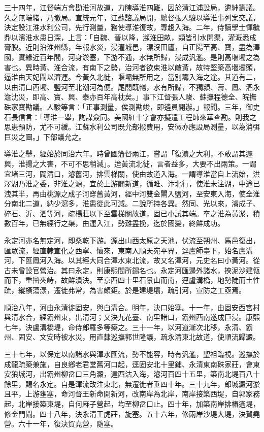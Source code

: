 \begin{pinyinscope}
三十四年，江督端方會勘淮河故道，力陳導淮四難，因於清江浦設局，遴紳籌議。久之無端緒，乃撤局。宣統元年，江蘇諮議局開，總督張人駿以導淮事列案交議，決定設江淮水利公司，先行測量，務使導淮復故，專趨入海。二年，侍讀學士惲毓鼎以濱淮水患日深，上言：「自魏、晉以降，瀕淮田畝，類皆引水開渠，灌溉悉成膏腴。近則沿淮州縣，年報水災，浸灌城邑，漂沒田廬，自正陽至高、寶，盡為澤國，實緣近百年間，河身淤塞，下游不通，水無所歸，浸成汎濫。是則高堰壩之為害也。異時黃、淮合流，有南下之勢，治河者欲束淮以敵黃，故特堅築高堰壩頭，逼淮由天妃閘以濟運。今黃久北徙，堰壩無所用之，當別籌入海之途。其道有二，以由清口西壩、鹽河至北潮河為便。尾閭既暢，水有所歸，不獨潁、壽、鳳、泗永澹沈災，即高、寶、興、泰亦百年高枕矣。」事下江督張人駿、蘇撫程德全、皖撫硃家寶勘議。人駿等言：「正事測量，俟測勘竣，即遴員開辦。」報聞。三年，御史石長信言：「導淮一舉，詢謀僉同。美國紅十字會亦擬遣工程師來華查勘。則我之思患預防，尤不可緩。江蘇水利公司既允部撥費用，安徽亦應設局測量，以為消弭巨災之圖。」下部議允之。

導淮之舉，經始於同治六年。時曾國籓督兩江，嘗謂「復瀆之大利，不敢謂其遽興，淮揚之大害，不可不思稍減」。迨黃流北徙，言者益多，大要不出兩策。一謂宜堵三河，闢清口，濬舊河，排雲梯關，使由故道入海。一謂導淮當自上流始，洪澤湖乃淮之委，非淮之源，宜於上游闢新道，循睢、汴北行，使淮未注湖，中途已洩其半，再由桃源之成子河穿舊黃河，經中河雙金閘入鹽河，至安東入海，使全淮分南北二道，納少瀉多，淮患從此可減。二說所持各異。然同、光以來，濬成子、碎石、沂、泗等河，疏楊莊以下至雲梯關故道，固已小試其端。卒之淮為黃淤，積數百年，已無經行之渠，由運入江，勢難盡挽，迄於國變，終鮮成功。

永定河亦名無定河，即桑乾下游。源出山西太原之天池，伏流至朔州、馬邑復出，匯眾流，經直隸宣化之西寧、懷來，東南入順天宛平界，逕盧師臺下，始名盧溝河，下匯鳳河入海。以其經大同合渾水東北流，故又名渾河，元史名曰小黃河。從古未曾設官營治。其曰永定，則康熙間所錫名也。永定河匯邊外諸水，挾泥沙建瓴而下，重巒夾峙，故鮮潰決。至京西四十里石景山而南，逕盧溝橋，地勢陡而土性疏，縱橫蕩漾，遷徙弗常，為害頗鉅。於是建堤壩，疏引河，宣防之工亟焉。

順治八年，河由永清徙固安，與白溝合。明年，決口始塞。十一年，由固安西宮村與清水合，經霸州東，出清河；又決九花臺、南里諸口，霸州西南遂成巨浸。康熙七年，決盧溝橋堤，命侍郎羅多等築之。三十一年，以河道漸次北移，永清、霸州、固安、文安時被水災，用直隸巡撫郭世隆議，疏永清東北故道，使順流歸澱。

三十七年，以保定以南諸水與渾水匯流，勢不能容，時有汎濫，聖祖臨視。巡撫於成龍疏築兼施，自良鄉老君堂舊河口起，逕固安北十里鋪、永清東南硃家莊，會東安狼城河，出霸州柳岔口三角澱，達西沽入海，濬河百四十五里，築南北堤百八十餘里，賜名永定。自是渾流改注東北，無遷徙者垂四十年。三十九年，郎城澱河淤且平，上游壅塞，命河督王新命開新河，改南岸為北岸，南岸接築西堤，自郭家務起，北岸接築東堤，自何麻子營起，均至柳岔口止。四十年，加築南岸排椿遙堤，修金門閘。四十八年，決永清王虎莊，旋塞。五十六年，修兩岸沙堤大堤，決賀堯營。六十一年，復決賀堯營，隨塞。


\end{pinyinscope}
